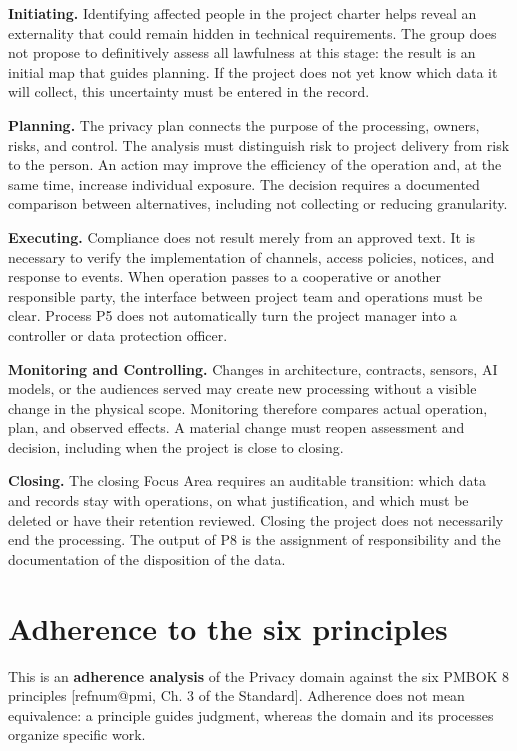 \documentclass[11pt,a4paper]{article}
\makeatletter
\newcommand{\refnum}[1]{\csname refnum@#1\endcsname}
\makeatother
\begin{document}
\textbf{Initiating.} Identifying affected people in the project charter helps reveal an externality that could remain hidden in technical requirements. The group does not propose to definitively assess all lawfulness at this stage: the result is an initial map that guides planning. If the project does not yet know which data it will collect, this uncertainty must be entered in the record.

\textbf{Planning.} The privacy plan connects the purpose of the processing, owners, risks, and control. The analysis must distinguish risk to project delivery from risk to the person. An action may improve the efficiency of the operation and, at the same time, increase individual exposure. The decision requires a documented comparison between alternatives, including not collecting or reducing granularity.

\textbf{Executing.} Compliance does not result merely from an approved text. It is necessary to verify the implementation of channels, access policies, notices, and response to events. When operation passes to a cooperative or another responsible party, the interface between project team and operations must be clear. Process P5 does not automatically turn the project manager into a controller or data protection officer.

\textbf{Monitoring and Controlling.} Changes in architecture, contracts, sensors, AI models, or the audiences served may create new processing without a visible change in the physical scope. Monitoring therefore compares actual operation, plan, and observed effects. A material change must reopen assessment and decision, including when the project is close to closing.

\textbf{Closing.} The closing Focus Area requires an auditable transition: which data and records stay with operations, on what justification, and which must be deleted or have their retention reviewed. Closing the project does not necessarily end the processing. The output of P8 is the assignment of responsibility and the documentation of the disposition of the data.

\section{Adherence to the six principles}

This is an \textbf{adherence analysis} of the Privacy domain against the six PMBOK 8 principles [\refnum{pmi}, Ch. 3 of the Standard]. Adherence does not mean equivalence: a principle guides judgment, whereas the domain and its processes organize specific work.
\end{document}
